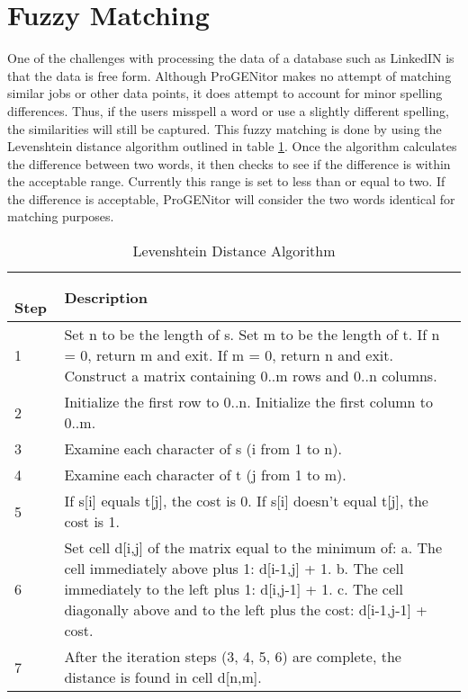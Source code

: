 \section{Fuzzy Matching}
\label{sect:fuzzy-matching}
One of the challenges with processing the data of a database such as LinkedIN is
that the data is free form.  Although ProGENitor makes no attempt of matching
similar jobs or other data points, it does attempt to account for minor spelling
differences.  Thus, if the users misspell a word or use a slightly different
spelling, the similarities will still be captured. This fuzzy matching is
done by using the Levenshtein distance algorithm\cite{fuzzy} outlined in table
\ref{tab:lev-dist}.  Once the algorithm calculates the difference between two
words, it then checks to see if the difference is within the acceptable range. 
Currently this range is set to less than or equal to two.  If the difference is
acceptable, ProGENitor will consider the two words identical for matching
purposes.


\begin{table}[H]
  \caption{Levenshtein Distance Algorithm}
  \centering
  \begin{tabular}{|p{.5in}|p{4in}|}
  \hline
  \
  Step & Description \\
  \hline\hline
  1 &  Set n to be the length of s.\newline 
  Set m to be the length of t.\newline
  If n = 0, return m and exit.\newline
  If m = 0, return n and exit.\newline
  Construct a matrix containing 0..m rows and 0..n columns.  \\ \hline 
  2 &  	Initialize the first row to 0..n.\newline
  Initialize the first column to 0..m.\\ \hline 
  3 & Examine each character of s (i from 1 to n). \\ \hline
  4 & Examine each character of t (j from 1 to m). \\ \hline
  5 &  	If s[i] equals t[j], the cost is 0.\newline
  If s[i] doesn't equal t[j], the cost is 1. \\\hline 
  6 &  	Set cell d[i,j] of the matrix equal to the minimum of:\newline
  a. The cell immediately above plus 1: d[i-1,j] + 1.\newline
  b. The cell immediately to the left plus 1: d[i,j-1] + 1.\newline
  c. The cell diagonally above and to the left plus the cost: d[i-1,j-1] + cost.\\ \hline
  7 & After the iteration steps (3, 4, 5, 6) are complete, the distance is found in cell d[n,m]. \\ \hline
  \end{tabular}
  \label{tab:lev-dist}
\end{table}

